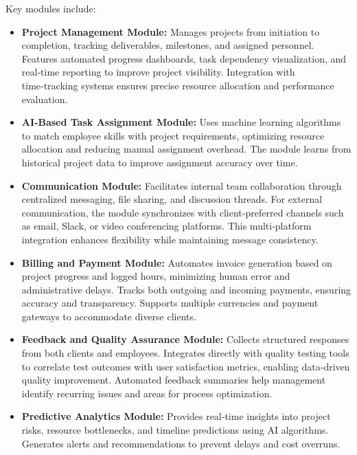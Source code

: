 \documentclass[12pt,a4paper]{article}
\begin{document}
Key modules include:
\begin{itemize}
    \item \textbf{Project Management Module:} Manages projects from initiation to completion, tracking deliverables, milestones, and assigned personnel.  Features automated progress dashboards, task dependency visualization, and real‑time reporting to improve project visibility.  Integration with time‑tracking systems ensures precise resource allocation and performance evaluation.
    
    \item \textbf{AI‑Based Task Assignment Module:} Uses machine learning algorithms to match employee skills with project requirements, optimizing resource allocation and reducing manual assignment overhead.  The module learns from historical project data to improve assignment accuracy over time.
    
    \item \textbf{Communication Module:} Facilitates internal team collaboration through centralized messaging, file sharing, and discussion threads.  For external communication, the module synchronizes with client‑preferred channels such as email, Slack, or video conferencing platforms.  This multi‑platform integration enhances flexibility while maintaining message consistency.
    
    \item \textbf{Billing and Payment Module:} Automates invoice generation based on project progress and logged hours, minimizing human error and administrative delays.  Tracks both outgoing and incoming payments, ensuring accuracy and transparency.  Supports multiple currencies and payment gateways to accommodate diverse clients.
    
    \item \textbf{Feedback and Quality Assurance Module:} Collects structured responses from both clients and employees.  Integrates directly with quality testing tools to correlate test outcomes with user satisfaction metrics, enabling data‑driven quality improvement.  Automated feedback summaries help management identify recurring issues and areas for process optimization.
    
    \item \textbf{Predictive Analytics Module:} Provides real‑time insights into project risks, resource bottlenecks, and timeline predictions using AI algorithms.  Generates alerts and recommendations to prevent delays and cost overruns.
\end{itemize}
\end{document}
